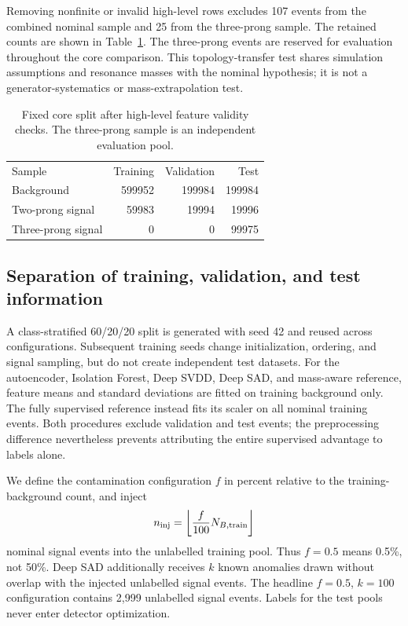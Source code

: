 \documentclass[reprint,aps,pra,amsmath,amssymb,floatfix,raggedbottom]{revtex4-2}
\begin{document}
Removing nonfinite or invalid high-level rows excludes 107 events from the combined nominal sample and 25 from the three-prong sample. The retained counts are shown in Table~\ref{tab:split}. The three-prong events are reserved for evaluation throughout the core comparison. This topology-transfer test shares simulation assumptions and resonance masses with the nominal hypothesis; it is not a generator-systematics or mass-extrapolation test.

\begin{table}[tbp]
\caption{Fixed core split after high-level feature validity checks. The three-prong sample is an independent evaluation pool.}\label{tab:split}
\begin{ruledtabular}\begin{tabular}{lrrr}
Sample & Training & Validation & Test\\
Background & 599952 & 199984 & 199984\\
Two-prong signal & 59983 & 19994 & 19996\\
Three-prong signal & 0 & 0 & 99975
\end{tabular}\end{ruledtabular}
\end{table}

\subsection{Separation of training, validation, and test information}
A class-stratified 60/20/20 split is generated with seed 42 and reused across configurations. Subsequent training seeds change initialization, ordering, and signal sampling, but do not create independent test datasets. For the autoencoder, Isolation Forest, Deep SVDD, Deep SAD, and mass-aware reference, feature means and standard deviations are fitted on training background only. The fully supervised reference instead fits its scaler on all nominal training events. Both procedures exclude validation and test events; the preprocessing difference nevertheless prevents attributing the entire supervised advantage to labels alone.

We define the contamination configuration $f$ in percent relative to the training-background count, and inject
\begin{equation}
 n_{\mathrm{inj}}=\left\lfloor {f\over100}N_{B,\mathrm{train}}\right\rfloor
\end{equation}
nominal signal events into the unlabelled training pool. Thus $f=0.5$ means 0.5\%, not 50\%. Deep SAD additionally receives $k$ known anomalies drawn without overlap with the injected unlabelled signal events. The headline $f=0.5$, $k=100$ configuration contains 2,999 unlabelled signal events. Labels for the test pools never enter detector optimization.
\end{document}
